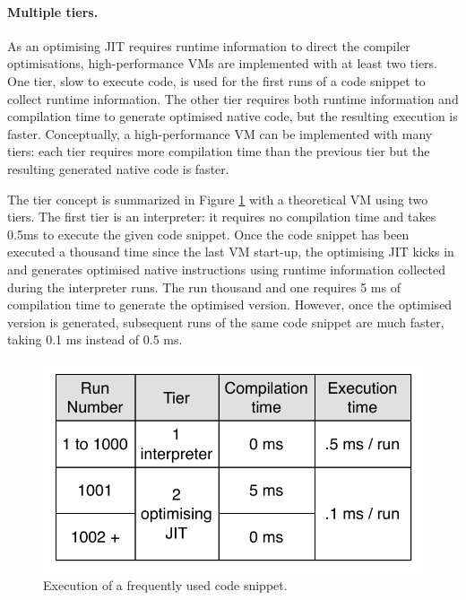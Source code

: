 \documentclass[a4paper,12pt,twoside]{../includes/ThesisStyle}
\begin{document}
\paragraph{Multiple tiers.} As an optimising JIT requires runtime information to direct the compiler optimisations, high-performance VMs are implemented with at least two tiers. One tier, slow to execute code, is used for the first runs of a code snippet to collect runtime information. The other tier requires both runtime information and compilation time to generate optimised native code, but the resulting execution is faster. Conceptually, a high-performance VM can be implemented with many tiers: each tier requires more compilation time than the previous tier but the resulting generated native code is faster.

The tier concept is summarized in Figure \ref{fig:GeneralTieredArchitecture} with a theoretical VM using two tiers. The first tier is an interpreter: it requires no compilation time and takes 0.5ms to execute the given code snippet. Once the code snippet has been executed a thousand time since the last VM start-up, the optimising JIT kicks in and generates optimised native instructions using runtime information collected during the interpreter runs. The run thousand and one requires 5 ms of compilation time to generate the optimised version. However, once the optimised version is generated, subsequent runs of the same code snippet are much faster, taking 0.1 ms instead of 0.5 ms.

\begin{figure}[h!]
    \begin{center}
        \includegraphics[width=0.5\linewidth]{GeneralTieredArchitecture}
        \caption{Execution of a frequently used code snippet.}
        \label{fig:GeneralTieredArchitecture}
    \end{center}
\end{figure}
\end{document}
